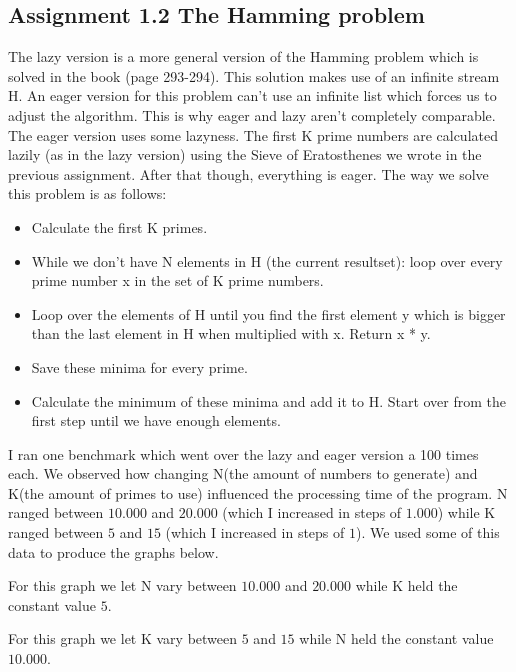 \documentclass[12pt, a4paper]{article}
\begin{document}
\subsection*{Assignment 1.2 The Hamming problem}
The lazy version is a more general version of the Hamming problem which is solved in the book (page 293-294). This solution makes use of an infinite stream H. An eager version for this problem can't use an infinite list which forces us to adjust the algorithm. This is why eager and lazy aren't completely comparable.\\
The eager version uses some lazyness. The first K prime numbers are calculated lazily (as in the lazy version) using the Sieve of Eratosthenes we wrote in the previous assignment. After that though, everything is eager. The way we solve this problem is as follows:
\begin{itemize}
\item Calculate the first K primes.
\item While we don't have N elements in H (the current resultset): loop over every prime number x in the set of K prime numbers.
\item Loop over the elements of H until you find the first element y which is bigger than the last element in H when multiplied with x. Return x * y.
\item Save these minima for every prime.
\item Calculate the minimum of these minima and add it to H. Start over from the first step until we have enough elements. 
\end{itemize}

I ran one benchmark which went over the lazy and eager version a 100 times each. We observed how changing N(the amount of numbers to generate) and K(the amount of primes to use) influenced the processing time of the program. N ranged between $10.000$ and $20.000$ (which I increased in steps of $1.000$) while K ranged between $5$ and $15$ (which I increased in steps of $1$). We used some of this data to produce the graphs below. 

\begin{center}

\end{center}
For this graph we let N vary between $10.000$ and $20.000$ while K held the constant value $5$.
\begin{center}

\end{center}
For this graph we let K vary between $5$ and $15$ while N held the constant value $10.000$.
\end{document}
